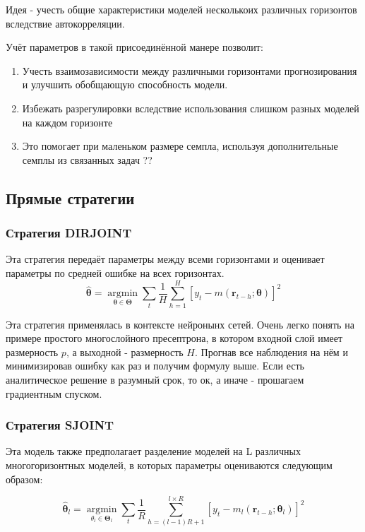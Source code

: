 \documentclass[a4paper,12pt]{article}
\begin{document}
Идея - учесть общие характеристики моделей несколькоих различных горизонтов вследствие автокорреляции. 

Учёт параметров в такой присоединённой манере позволит:

\begin{enumerate}[\Sun]
	\item Учесть взаимозависимости между различными горизонтами прогнозирования и улучшить обобщающую способность модели.
	
	\item Избежать разрегулировки вследствие использования слишком разных моделей на каждом горизонте
	
	\item Это помогает при маленьком размере семпла, используя дополнительные семплы из связанных задач ??
\end{enumerate}

\subsection{Прямые стратегии}
\subsubsection{Стратегия DIRJOINT}

Эта стратегия передаёт параметры между всеми горизонтами и оценивает параметры по средней ошибке на всех горизонтах.
\[
\hat{\boldsymbol{\theta}}=\underset{\boldsymbol{\theta} \in \boldsymbol{\Theta}}{\operatorname{argmin}} \sum_{t} \frac{1}{H} \sum_{h=1}^{H}\left[y_{t}-m\left(\boldsymbol{r}_{t-h} ; \boldsymbol{\theta}\right)\right]^{2}
\]

Эта стратегия применялась в контексте нейронынх сетей. Очень легко понять на примере простого многослойного пресептрона, в котором входной слой имеет размерность $ p $, а выходной - размерность $ H $.  Прогнав все наблюдения на нём и минимизировав ошибку как раз и получим формулу выше. Если есть аналитическое решение в разумный срок, то ок, а иначе - прошагаем градиентным спуском.

\subsubsection{Стратегия SJOINT}

Эта модель также предполагает разделение моделей на L различных многогоризонтных моделей, в которых параметры оцениваются следующим образом:

\[
\hat{\boldsymbol{\theta}}_{l}=\underset{\theta_{l} \in \boldsymbol{\Theta}_{l}}{\operatorname{argmin}} \sum_{t} \frac{1}{R} \sum_{h=(l-1)R+1}^{l \times R}\left[y_{t}-m_{l}\left(\boldsymbol{r}_{t-h} ; \boldsymbol{\theta}_{l}\right)\right]^{2}
\]
\end{document}
